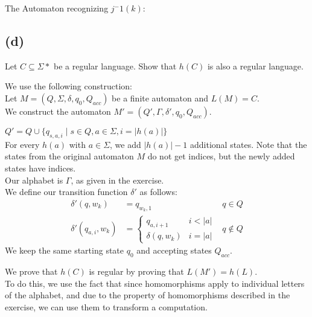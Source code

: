 The Automaton recognizing $j^-1(k)$: \\


\subsection{(d)}

Let $C \subseteq \Sigma *$ be a regular language. Show that $h(C)$ is also a regular language.

We use the following construction:\\
Let $M=(Q,\Sigma,\delta,q_{0},Q_{acc})$ be a finite automaton and $L(M)=C$.\\
We construct the automaton $M'=(Q',\Gamma,\delta', q_{0}, Q_{acc})$.

$Q'=Q\cup \{ q_{s,a,i}\mid s\in Q, a \in \Sigma, i = \lvert h(a) \rvert \} $\\
For every $h(a)$ with $a \in \Sigma$, we add $\lvert h(a)\rvert -1$ additional states. Note that the states from the original automaton $M$ do not get indices, but the newly added states have indices.\\
Our alphabet is $\Gamma$, as given in the exercise.\\
We define our transition function $\delta'$ as follows:\\
\begin{align*}
\delta' (q, w_{k}) &= q_{w_{k},1} &q\in Q\\
\delta' (q_{a,i}, w_{k}) &= 
\begin{cases}
    q_{a,i+1} &i < \lvert a \rvert\\
    \delta(q, w_{k})&i=\lvert a \rvert
\end{cases}
&q\notin Q
\end{align*}
We keep the same starting state $q_{0}$ and accepting states $Q_{acc}$.

\vskip 10pt
We prove that $h(C)$ is regular by proving that $L(M') = h(L)$.\\
To do this, we use the fact that since homomorphisms apply to individual letters of the alphabet, and due to the property of homomorphisms described in the exercise, we can use them to transform a computation.\\

